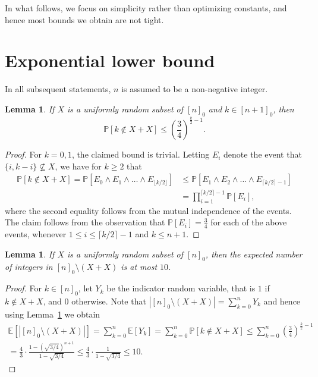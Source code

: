 \documentclass{article}
\newcommand{\ev}{\mathbb{E}}
\newcommand{\prob}{\mathbb{P}}
\newtheorem{lemma}[theorem]{Lemma}
\begin{document}
In what follows, we focus on simplicity rather than optimizing constants, and hence most bounds we obtain are not tight.

\section{Exponential lower bound}

In all subsequent statements, $n$ is assumed to be a non-negative integer.


\begin{lemma}
    \label{lemNotGenerated}
    If $X$ is a uniformly random subset of $[n]_0$ and $k \in [n + 1]_0$, then
    \[
        \prob[k \notin X + X] \le \left( \frac{3}{4} \right)^{\frac{k}{2} - 1}.
    \]
\end{lemma}
\begin{proof}
    For $k=0,1$, the claimed bound is trivial. Letting $E_i$ denote the event that $\{i,k-i\} \not \subseteq X$, we have for $k \ge 2$ that
    \begin{align*}
        \prob[k \notin X + X]
        = \prob[E_0\wedge E_1 \wedge \dots \wedge E_{\lfloor k/2 \rfloor}]
        & \le \prob[E_1 \wedge E_2 \wedge \dots \wedge E_{\lceil k/2 \rceil - 1}] \\
        & = \prod_{i=1}^{\lceil k/2 \rceil - 1} \prob[E_i],
    \end{align*}
    where the second equality follows from the mutual independence of the events.
    The claim follows from the observation that $\prob[E_i] = \frac{3}{4}$ for each of the above events, whenever $1 \le i \le \lceil k/2 \rceil - 1$ and $k \le n + 1$.
\end{proof}

\begin{lemma}
    \label{lemRandom}
    If $X$ is a uniformly random subset of $[n]_0$, then the expected number of integers in $[n]_0 \setminus (X + X)$ is at most $10$.
\end{lemma}
\begin{proof}
    For $k \in [n]_0$, let $Y_k$ be the indicator random variable, that is $1$ if $k \notin X + X$, and $0$ otherwise.
    Note that $|[n]_0 \setminus (X + X)| = \sum_{k=0}^n Y_k$ and hence using Lemma~\ref{lemNotGenerated} we obtain
    \begin{multline*}
        \ev[|[n]_0 \setminus (X + X)|]
            = \sum_{k=0}^n \ev[Y_k]
            = \sum_{k=0}^n \prob[k \notin X + X]
            \le \sum_{k=0}^n \left( \frac{3}{4} \right)^{\frac{k}{2} - 1} \\
            = \frac{4}{3} \cdot \frac{1 - \left( \sqrt{3/4} \right)^{n+1}}{1 - \sqrt{3/4}}
            \le \frac{4}{3} \cdot \frac{1}{1 - \sqrt{3/4}}
            \le 10.
    \end{multline*}
\end{proof}
\end{document}
